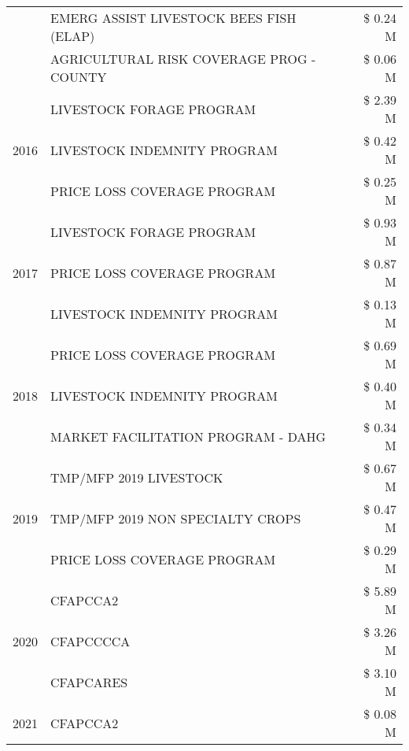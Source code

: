 \begin{tabular}{llr}
 & EMERG ASSIST LIVESTOCK BEES FISH (ELAP) & \$ 0.24 M \\
 & AGRICULTURAL RISK COVERAGE PROG - COUNTY & \$ 0.06 M \\
\cline{1-3}
\multirow[t]{3}{*}{2016} & LIVESTOCK FORAGE PROGRAM                      & \$ 2.39 M \\
 & LIVESTOCK INDEMNITY PROGRAM                   & \$ 0.42 M \\
 & PRICE LOSS COVERAGE PROGRAM                   & \$ 0.25 M \\
\cline{1-3}
\multirow[t]{3}{*}{2017} & LIVESTOCK FORAGE PROGRAM & \$ 0.93 M \\
 & PRICE LOSS COVERAGE PROGRAM & \$ 0.87 M \\
 & LIVESTOCK INDEMNITY PROGRAM & \$ 0.13 M \\
\cline{1-3}
\multirow[t]{3}{*}{2018} & PRICE LOSS COVERAGE PROGRAM & \$ 0.69 M \\
 & LIVESTOCK INDEMNITY PROGRAM & \$ 0.40 M \\
 & MARKET FACILITATION PROGRAM - DAHG & \$ 0.34 M \\
\cline{1-3}
\multirow[t]{3}{*}{2019} & TMP/MFP 2019 LIVESTOCK & \$ 0.67 M \\
 & TMP/MFP 2019 NON SPECIALTY CROPS & \$ 0.47 M \\
 & PRICE LOSS COVERAGE PROGRAM & \$ 0.29 M \\
\cline{1-3}
\multirow[t]{3}{*}{2020} & CFAPCCA2 & \$ 5.89 M \\
 & CFAPCCCCA & \$ 3.26 M \\
 & CFAPCARES & \$ 3.10 M \\
\cline{1-3}
2021 & CFAPCCA2 & \$ 0.08 M \\
\cline{1-3}
\bottomrule
\end{tabular}
